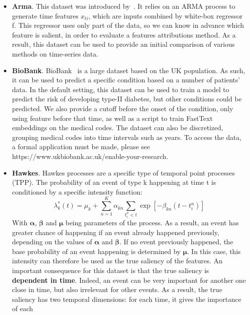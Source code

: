 \begin{itemize}
    \item \textbf{Arma}.
        This dataset was introduced by~\citep{crabbe2021explaining}.
        It relies on an ARMA process to generate time features $x_{ti}$, which are inputs combined by white-box
        regressor f.
        This regressor uses only part of the data, so we can know in advance which feature is salient, in order to
        evaluate a features attributions method.
        As a result, this dataset can be used to provide an initial comparison of various methods on time-series data.
    \item \textbf{BioBank}.
        BioBank~\citep{sudlow2015uk} is a large dataset based on the UK population.
        As such, it can be used to predict a specific condition based on a number of patients' data.
        In the default setting, this dataset can be used to train a model to predict the risk of developing type-II
        diabetes, but other conditions could be predicted.
        We also provide a cutoff before the onset of the condition, only using feature before that time, as well as
        a script to train FastText~\citep{bojanowski2017enriching} embeddings on the medical codes.
        The dataset can also be discretized, grouping medical codes into time intervals such as years.
        To access the data, a formal application must be made, please see
        https://www.ukbiobank.ac.uk/enable-your-research.
    \item \textbf{Hawkes}.
        Hawkes processes are a specific type of temporal point processes (TPP).
        The probability of an event of type k happening at time t is conditioned by a specific intensity function:
        \[ \lambda^*_k(t) = \mu_k + \sum_{n=1}^K \alpha_{kn} \sum_{t_i^n < t} \exp \left[ -\beta_{kn} (t - t_i^n) \right] \]
        With $\bm{\alpha}$, $\bm{\beta}$ and $\bm{\mu}$ being parameters of the process.
        As a result, an event has greater chance of happening if an event already happened previously, depending on the
        values of $\bm{\alpha}$ and $\bm{\beta}$.
        If no event previously happened, the base probability of an event happening is determined by $\bm{\mu}$.
        In this case, this intensity can therefore be used as the true saliency of the features.
        An important consequence for this dataset is that the true saliency is \textbf{dependent in time}.
        Indeed, an event can be very important for another one close in time, but also irrelevant for other events.
        As a result, the true saliency has two temporal dimensions: for each time, it gives the importance of each

\end{itemize}
